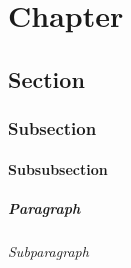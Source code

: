 \documentclass[11pt]{report}
\begin{document}
	\maketitle
	\tableofcontents
	
	\chapter{Chapter}
	\section{Section}
	\subsection{Subsection}
	\subsubsection{Subsubsection}
	\paragraph{Paragraph}
	\subparagraph{Subparagraph}
	
	\blinddocument
	\blindmathpaper
	
	\Blinddocument
\end{document}
